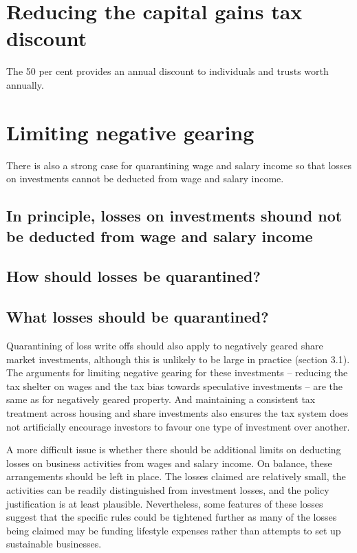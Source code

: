 \documentclass{grattan}\usepackage[]{graphicx}\usepackage[]{color}
\begin{document}
\section{Reducing the capital gains tax discount}
The 50 per cent  provides an annual discount to individuals and trusts worth  annually.

\TBD{\dots}

\section{Limiting negative gearing}
There is also a strong case for quarantining wage and salary income so that losses on investments cannot be deducted from wage and salary income. 
\subsection{In principle, losses on investments shound not be deducted from wage and salary income}
\subsection{How should losses be quarantined?}
\subsection{What losses should be quarantined?}
Quarantining of loss write offs should also apply to negatively geared share market investments, although this is unlikely to be large in practice (section 3.1). The arguments for limiting negative gearing for these investments -- reducing the tax shelter on wages and the tax bias towards speculative investments -- are the same as for negatively geared property. And maintaining a consistent tax treatment across housing and share investments also ensures the tax system does not artificially encourage investors to favour one type of investment over another.  

A more difficult issue is whether there should be additional limits on deducting losses on business activities from wages and salary income.  On balance, these arrangements should be left in place. The losses claimed are relatively small, the activities can be readily distinguished from investment losses, and the policy justification is at least plausible. Nevertheless, some features of these losses suggest that the specific rules could be tightened further as many of the losses being claimed may be funding lifestyle expenses rather than attempts to set up sustainable businesses. 
\end{document}
